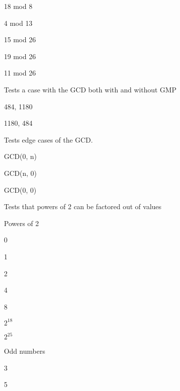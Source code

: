 \begin{DoxyRefList}
\begin{DoxyItemize}
\item 18 mod 8
\item 4 mod 13
\item 15 mod 26
\item 19 mod 26
\item 11 mod 26 
\end{DoxyItemize}
\item[\label{test__test000021}%
\hypertarget{test__test000021}{}%
Member \hyperlink{test__gcd_8cpp_a6f7b903f7df0e5b1b07625691a41edd0}{T\+E\+S\+T\+\_\+\+C\+A\+SE} (\char`\"{}\+The gcd function\char`\"{})]Tests a case with the G\+CD both with and without G\+MP
\begin{DoxyItemize}
\item 484, 1180
\item 1180, 484  
\end{DoxyItemize}
\item[\label{test__test000020}%
\hypertarget{test__test000020}{}%
Member \hyperlink{test__gcd_8cpp_ae3ce0f22773af53e2cfd56db16b658f0}{T\+E\+S\+T\+\_\+\+C\+A\+SE} (\char`\"{}\+Gcd edge cases\char`\"{})]Tests edge cases of the G\+CD.
\begin{DoxyItemize}
\item G\+C\+D(0, n)
\item G\+C\+D(n, 0)
\item G\+C\+D(0, 0)  
\end{DoxyItemize}
\item[\label{test__test000019}%
\hypertarget{test__test000019}{}%
Member \hyperlink{test__factor2s_8cpp_ad3239a84656b298f835d0a554a06a377}{T\+E\+S\+T\+\_\+\+C\+A\+SE} (\char`\"{}\+The factor2s function\char`\"{})]Tests that powers of 2 can be factored out of values
\begin{DoxyItemize}
\item Powers of 2
\begin{DoxyItemize}
\item 0
\item 1
\item 2
\item 4
\item 8
\item $ 2^18 $
\item $ 2^25 $
\end{DoxyItemize}
\item Odd numbers
\begin{DoxyItemize}
\item 3
\item 5

\end{DoxyItemize}
\end{DoxyItemize}
\end{DoxyRefList}
